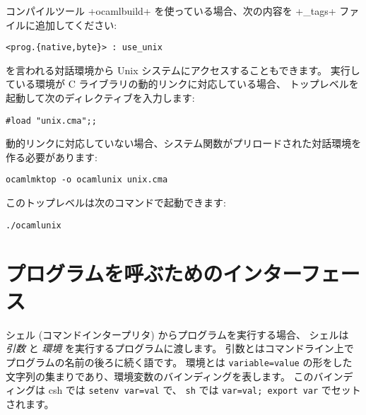 コンパイルツール \ml+ocamlbuild+ を使っている場合、次の内容を \ml+_tags+ ファイルに追加してください:
%
\begin{lstlisting}
<prog.{native,byte}> : use_unix
\end{lstlisting}
%
 を言われる対話環境から Unix システムにアクセスすることもできます。
実行している環境が C ライブラリの動的リンクに対応している場合、
\ocaml トップレベルを起動して次のディレクティブを入力します:
%
\begin{lstlisting}
#load "unix.cma";;
\end{lstlisting}
%
動的リンクに対応していない場合、システム関数がプリロードされた対話環境を作る必要があります:
%
\begin{lstlisting}
ocamlmktop -o ocamlunix unix.cma
\end{lstlisting}
%
このトップレベルは次のコマンドで起動できます:
\begin{lstlisting}
./ocamlunix
\end{lstlisting}

\section{プログラムを呼ぶためのインターフェース}

シェル (コマンドインタープリタ) からプログラムを実行する場合、
シェルは \emph{引数} と \emph{環境} を実行するプログラムに渡します。
引数とはコマンドライン上でプログラムの名前の後ろに続く語です。
環境とは \texttt{variable=value} の形をした文字列の集まりであり、環境変数のバインディングを表します。
このバインディングは csh では \texttt{setenv var=val} で、 \texttt{sh} では \texttt{var=val; export var}
でセットされます。

